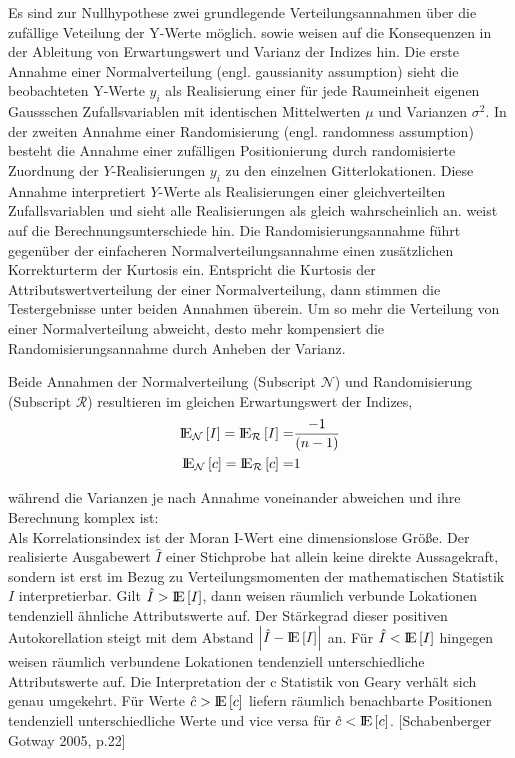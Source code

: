 Es sind zur Nullhypothese zwei grundlegende Verteilungsannahmen über die zufällige Veteilung der Y-Werte möglich. 
\cite[S.22]{schabenberger_statistical_2005} sowie \cite[S. 264]{fischer_handbook_2010} weisen auf die Konsequenzen in der Ableitung von Erwartungswert und Varianz der Indizes hin.
Die erste Annahme einer Normalverteilung (engl. gaussianity assumption) sieht die beobachteten Y-Werte $y_i$ 
als Realisierung einer für jede Raumeinheit eigenen Gaussschen Zufallsvariablen mit identischen Mittelwerten $\mu$ und Varianzen $\sigma^2$.
In der zweiten Annahme einer Randomisierung (engl. randomness assumption) besteht die Annahme 
einer zufälligen Positionierung durch randomisierte Zuordnung der $Y$-Realisierungen $y_i$ zu den einzelnen Gitterlokationen.
Diese Annahme interpretiert $Y$-Werte als Realisierungen einer gleichverteilten Zufallsvariablen und sieht alle Realisierungen als gleich wahrscheinlich an.
\cite[S. 280]{bivand_applied_2013} weist auf die Berechnungsunterschiede hin. %
Die Randomisierungsannahme führt gegenüber der einfacheren Normalverteilungsannahme einen zusätzlichen Korrekturterm der Kurtosis ein. 
Entspricht die Kurtosis der Attributswertverteilung der einer Normalverteilung, dann stimmen die Testergebnisse unter beiden Annahmen überein. 
Um so mehr die Verteilung von einer Normalverteilung abweicht, desto mehr kompensiert die Randomisierungsannahme durch Anheben der Varianz.

Beide Annahmen der Normalverteilung (Subscript $\mathcal{N}$) und Randomisierung (Subscript $\mathcal{R}$) resultieren im gleichen Erwartungswert der Indizes,
\begin{eqnarray}
    {\rm I\!E}_{\mathcal{N}} \left[I \right]={\rm I\!E}_{\mathcal{R}}\left[ I \right] =& \frac{-1}{(n-1)} \\
    {\rm I\!E}_{\mathcal{N}} \left[c \right]={\rm I\!E}_{\mathcal{R}}\left[ c \right] =& 1
\end{eqnarray}

während die Varianzen je nach Annahme voneinander abweichen und ihre Berechnung komplex ist: \\


Als Korrelationsindex ist der Moran I-Wert eine dimensionslose Größe. 
Der realisierte Ausgabewert $\hat{I}$ einer Stichprobe hat allein keine direkte Aussagekraft, sondern ist erst im Bezug zu 
Verteilungsmomenten der mathematischen Statistik $I$ interpretierbar. 
Gilt $\hat{I}>{\rm I\!E}\left[I\right]$, dann weisen räumlich verbunde Lokationen tendenziell ähnliche Attributswerte auf. 
Der Stärkegrad dieser positiven Autokorellation steigt mit dem Abstand $\left| \hat{I}-{\rm I\!E}\left[ I \right] \right|$ an. 
Für $\hat{I}<{\rm I\!E}\left[ I \right]$ hingegen weisen räumlich verbundene Lokationen tendenziell unterschiedliche Attributswerte auf. 
Die Interpretation der c Statistik von Geary verhält sich genau umgekehrt. 
Für Werte $\hat{c}>{\rm I\!E}\left[c\right]$ liefern räumlich benachbarte Positionen tendenziell unterschiedliche Werte 
und vice versa für $\hat{c}<{\rm I\!E}\left[c\right]$. [Schabenberger Gotway 2005, p.22]

